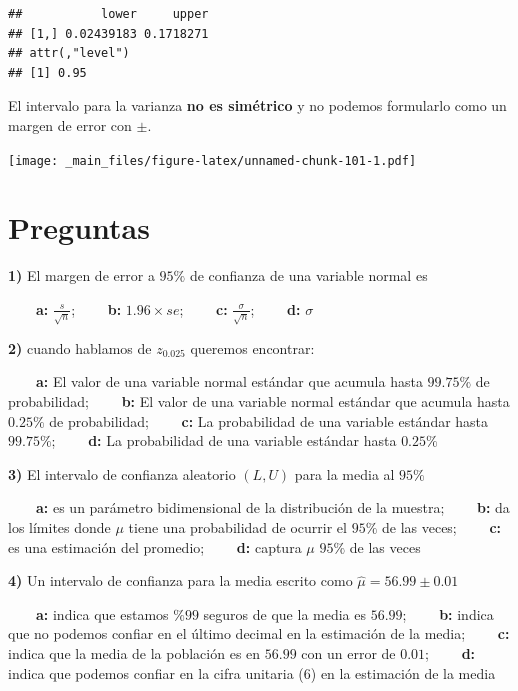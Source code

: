 \documentclass[
]{book}
\begin{document}
\begin{verbatim}
##           lower     upper
## [1,] 0.02439183 0.1718271
## attr(,"level")
## [1] 0.95
\end{verbatim}

El intervalo para la varianza \textbf{no es simétrico} y no podemos formularlo como un margen de error con \(\pm\).

\texttt{[image: \_main\_files/figure-latex/unnamed-chunk-101-1.pdf]}

\hypertarget{preguntas-10}{%
\section{Preguntas}\label{preguntas-10}}

\textbf{1)} El margen de error a \(95\%\) de confianza de una variable normal es

\textbf{\(\qquad\)a:} \(\frac{s}{\sqrt{n}}\);
\textbf{\(\qquad\)b:} \(1.96\times se\);
\textbf{\(\qquad\)c:} \(\frac{\sigma}{\sqrt{n}}\);
\textbf{\(\qquad\)d:} \(\sigma\)

\textbf{2)} cuando hablamos de \(z_{0.025}\) queremos encontrar:

\textbf{\(\qquad\)a:} El valor de una variable normal estándar que acumula hasta \(99.75\%\) de probabilidad;
\textbf{\(\qquad\)b:} El valor de una variable normal estándar que acumula hasta \(0.25\%\) de probabilidad;
\textbf{\(\qquad\)c:} La probabilidad de una variable estándar hasta \(99.75\%\);
\textbf{\(\qquad\)d:} La probabilidad de una variable estándar hasta \(0.25\%\)

\textbf{3)} El intervalo de confianza aleatorio \((L,U)\) para la media al \(95\%\)

\textbf{\(\qquad\)a:} es un parámetro bidimensional de la distribución de la muestra;
\textbf{\(\qquad\)b:} da los límites donde \(\mu\) tiene una probabilidad de ocurrir el \(95\%\) de las veces;
\textbf{\(\qquad\)c:} es una estimación del promedio;
\textbf{\(\qquad\)d:} captura \(\mu\) \(95\%\) de las veces

\textbf{4)} Un intervalo de confianza para la media escrito como \(\hat{\mu}=56.99 \pm 0.01\)

\textbf{\(\qquad\)a:} indica que estamos \(\%99\) seguros de que la media es \(56.99\);
\textbf{\(\qquad\)b:} indica que no podemos confiar en el último decimal en la estimación de la media;
\textbf{\(\qquad\)c:} indica que la media de la población es en \(56.99\) con un error de \(0.01\);
\textbf{\(\qquad\)d:} indica que podemos confiar en la cifra unitaria (\(6\)) en la estimación de la media
\end{document}
